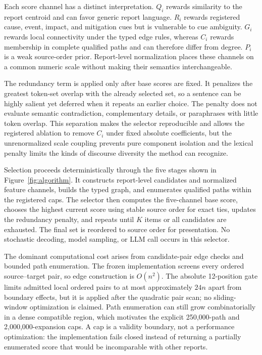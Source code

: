 \documentclass[applsci,article,submit,moreauthors]{Definitions/mdpi}
\begin{document}
Each score channel has a distinct interpretation. $Q_i$ rewards similarity to the report centroid and can favor generic report language. $R_i$ rewards registered cause, event, impact, and mitigation cues but is vulnerable to cue ambiguity. $G_i$ rewards local connectivity under the typed edge rules, whereas $C_i$ rewards membership in complete qualified paths and can therefore differ from degree. $P_i$ is a weak source-order prior. Report-level normalization places these channels on a common numeric scale without making their semantics interchangeable.

The redundancy term is applied only after base scores are fixed. It penalizes the greatest token-set overlap with the already selected set, so a sentence can be highly salient yet deferred when it repeats an earlier choice. The penalty does not evaluate semantic contradiction, complementary details, or paraphrases with little token overlap. This separation makes the selector reproducible and allows the registered ablation to remove $C_i$ under fixed absolute coefficients, but the unrenormalized scale coupling prevents pure component isolation and the lexical penalty limits the kinds of discourse diversity the method can recognize.

Selection proceeds deterministically through the five stages shown in Figure~\ref{fig:algorithm}. It constructs report-level candidates and normalized feature channels, builds the typed graph, and enumerates qualified paths within the registered caps. The selector then computes the five-channel base score, chooses the highest current score using stable source order for exact ties, updates the redundancy penalty, and repeats until $K$ items or all candidates are exhausted. The final set is reordered to source order for presentation. No stochastic decoding, model sampling, or LLM call occurs in this selector.

The dominant computational cost arises from candidate-pair edge checks and bounded path enumeration. The frozen implementation screens every ordered source--target pair, so edge construction is $O(n^2)$. The absolute 12-position gate limits admitted local ordered pairs to at most approximately $24n$ apart from boundary effects, but it is applied after the quadratic pair scan; no sliding-window optimization is claimed. Path enumeration can still grow combinatorially in a dense compatible region, which motivates the explicit 250,000-path and 2,000,000-expansion caps. A cap is a validity boundary, not a performance optimization: the implementation fails closed instead of returning a partially enumerated score that would be incomparable with other reports.
\end{document}
